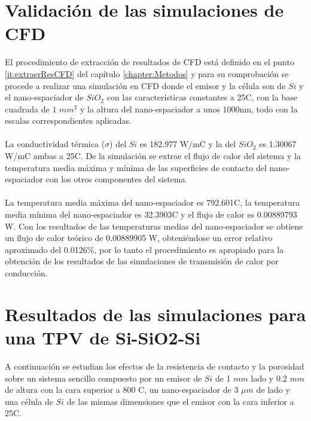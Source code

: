 \section{Validación de las simulaciones de CFD}
El procedimiento de extracción de resultados de CFD está definido en el punto \ref{it:extraerResCFD} del capítulo \ref{chapter:Metodos} y para su comprobación se procede a realizar una simulación en CFD donde el emisor y la célula son de $Si$ y el nano-espaciador de $SiO_2$ con las características constantes a 25\textdegree C, con la base cuadrada de 1 $mm^2$ y la altura del nano-espaciador a unos 1000nm, todo con la escalas correspondientes aplicadas.\\\\
La conductividad térmica ($\sigma$) del $Si$ es 182.977 W/m\textdegree C y la del $SiO_2$ es 1.30067 W/m\textdegree C ambas a 25\textdegree C. De la simulación se extrae el flujo de calor del sistema y la temperatura media máxima y mínima de las superficies de contacto del nano-espaciador con los otros componentes del sistema.\\\\
La temperatura media máxima del nano-espaciador es 792.601\textdegree C, la temperatura media mínima del nano-espaciador es 32.3903\textdegree C y el flujo de calor es 0.00889793 W. Con los resultados de las temperaturas medias del nano-espaciador se obtiene un flujo de calor teórico de 0.00889905 W, obteniéndose un error relativo aproximado del 0.0126\%, por lo tanto el procedimiento es apropiado para la obtención de los resultados de las simulaciones de transmisión de calor por conducción.
\section{Resultados de las simulaciones para una TPV de Si-SiO2-Si}
A continuación se estudian los efectos de la resistencia de contacto y la porosidad sobre un sistema sencillo compuesto por un emisor de $Si$ de 1 $mm$ lado y 0.2 $mm$ de altura con la cara superior a 800 \textdegree C, un nano-espaciador de 3 $\mu m$ de lado y una célula de $Si$ de las mismas dimensiones que el emisor con la cara inferior a 25\textdegree C.

